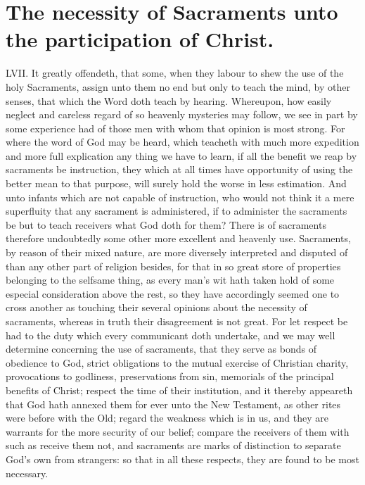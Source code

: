 \section*{The necessity of Sacraments unto the participation of Christ.}
LVII. It greatly offendeth, that some, when they labour to shew the use of the holy Sacraments, assign unto them no end but only to teach the mind, by other senses, that which the Word doth teach by hearing. Whereupon, how easily neglect and careless regard of so heavenly mysteries may follow, we see in part by some experience had of those men with whom that opinion is most strong. For where the word of God may be heard, which teacheth with much more expedition and more full explication any thing we have to learn, if all the benefit we reap by sacraments be instruction, they which at all times have opportunity of using the better mean to that purpose, will surely hold the worse in less estimation. And unto infants which are not capable of instruction, who would not think it a mere superfluity that any sacrament is administered, if to administer the sacraments be but to teach receivers what God doth for them? There is of sacraments therefore undoubtedly some other more excellent and heavenly use.
Sacraments, by reason of their mixed nature, are more diversely interpreted and disputed of than any other part of religion besides, for that in so great store of properties belonging to the selfsame thing, as every man’s wit hath taken hold of some especial consideration above the rest, so they have accordingly seemed one to cross another as touching their several opinions about the necessity of sacraments, whereas in truth their disagreement is not great. For let respect be had to the duty which every communicant doth undertake, and we may well determine concerning the use of sacraments, that they serve as bonds of obedience to God, strict obligations to the mutual exercise of Christian charity, provocations to godliness, preservations from sin, memorials of the principal benefits of Christ; respect the time of their institution, and it thereby appeareth that God hath annexed them for ever unto the New Testament, as other rites were before with the Old; regard the weakness which is in us, and they are warrants for the more security of our belief; compare the receivers of them with such as receive them not, and sacraments are marks of distinction to separate God’s own from strangers: so that in all these respects, they are found to be most necessary.
